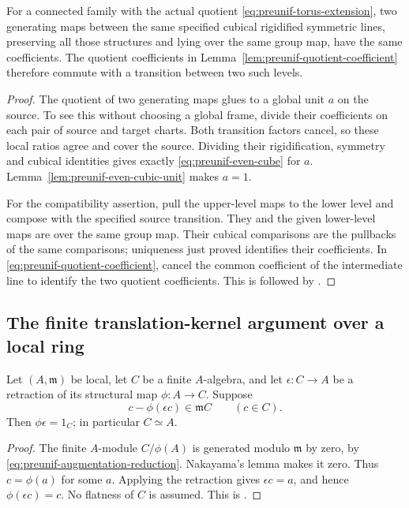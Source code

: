 \begin{srlemma}
\label{lem:preunif-coefficient-unique}
For a connected family with the actual quotient
\eqref{eq:preunif-torus-extension}, two generating maps between the
same specified cubical rigidified symmetric lines, preserving all
those structures and lying over the same group map, have the same
coefficients.
The quotient coefficients in Lemma~\ref{lem:preunif-quotient-coefficient}
therefore commute with a transition between two such levels.
\end{srlemma}
\begin{proof}
The quotient of two generating maps glues to a global unit \(a\)
on the source.  To see this without choosing a global frame, divide
their coefficients on each pair of source and target charts.
Both transition factors cancel, so these local ratios agree and
cover the source.  Dividing their rigidification, symmetry and
cubical identities gives exactly \eqref{eq:preunif-even-cube}
for \(a\).  Lemma~\ref{lem:preunif-even-cubic-unit} makes \(a=1\).

For the compatibility assertion, pull the upper-level maps to the
lower level and compose with the specified source transition.
They and the given lower-level maps are over the same group map.
Their cubical comparisons are the pullbacks of the same comparisons;
uniqueness just proved identifies their coefficients.
In \eqref{eq:preunif-quotient-coefficient}, cancel the common
coefficient of the intermediate line to identify the two
quotient coefficients.  This is 
followed by .
\end{proof}

\subsection{The finite translation-kernel argument over a local ring}
\begin{srlemma}
\label{lem:preunif-finite-augmentation}
Let \((A,\mathfrak m)\) be local, let \(C\) be a finite \(A\)-algebra,
and let \(\epsilon:C\to A\) be a retraction of its structural map
\(\phi:A\to C\).  Suppose
\[
                    c-\phi(\epsilon c)\in\mathfrak m C
                    \qquad(c\in C).
 \tag{PUF6}\label{eq:preunif-augmentation-reduction}
\]
Then \(\phi\epsilon=1_C\); in particular \(C\simeq A\).
\end{srlemma}
\begin{proof}
The finite \(A\)-module \(C/\phi(A)\) is generated modulo
\(\mathfrak m\) by zero, by
\eqref{eq:preunif-augmentation-reduction}.
Nakayama's lemma makes it zero.  Thus \(c=\phi(a)\) for some \(a\).
Applying the retraction gives \(\epsilon c=a\), and hence
\(\phi(\epsilon c)=c\).
No flatness of \(C\) is assumed.  This is
.
\end{proof}

